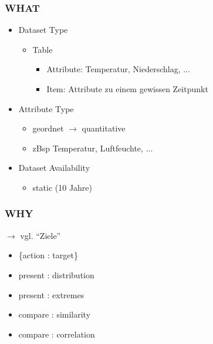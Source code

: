 \documentclass{beamer}
\begin{document}
  
  \begin{frame}
  \frametitle{WHAT}
    \begin{itemize}
    \item Dataset Type
      \begin{itemize}
	  \item Table 
	  \begin{itemize}
	   \item Attribute: Temperatur, Niederschlag, ...
	   \item Item: Attribute zu einem gewissen Zeitpunkt
	  \end{itemize}
      \end{itemize}
    \item Attribute Type
      \begin{itemize}
	\item geordnet $\rightarrow$ quantitative
	\item zBsp Temperatur, Luftfeuchte, ...
      \end{itemize}
    \item Dataset Availability
      \begin{itemize}
	\item static (10 Jahre)
      \end{itemize}
    \end{itemize}  
  \end{frame} 
  
  \begin{frame}
  \frametitle{WHY}
  $\rightarrow$ vgl. ``Ziele''
    \begin{itemize}
      \item \{action : target\}
      \item present : distribution
      \item present : extremes
      \item compare : similarity
      \item compare : correlation
    \end{itemize}
  \end{frame}
  
\end{document}
